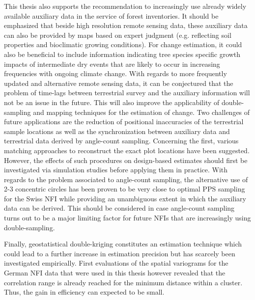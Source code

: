 This thesis also supports the recommendation to increasingly use already widely available auxiliary data in the service of forest inventories. It should be emphasized that beside high resolution remote sensing data, these auxiliary data can also be provided by maps based on expert judgment (e.g. reflecting soil properties and bioclimatic growing conditions). For change estimation, it could also be beneficial to include information indicating tree species specific growth impacts of intermediate dry events that are likely to occur in increasing frequencies with ongoing climate change. With regards to more frequently updated and alternative remote sensing data, it can be conjectured that the problem of time-lags between terrestrial survey and the auxiliary information will not be an issue in the future. This will also improve the applicability of double-sampling and mapping techniques for the estimation of change. Two challenges of future applications are the reduction of positional inaccuracies of the terrestrial sample locations as well as the synchronization between auxiliary data and terrestrial data derived by angle-count sampling. Concerning the first, various matching approaches to reconstruct the exact plot locations have been suggested. However, the effects of such procedures on design-based estimates should first be investigated via simulation studies before applying them in practice. With regards to the problem associated to angle-count sampling, the alternative use of 2-3 concentric circles has been proven to be very close to optimal PPS sampling for the Swiss NFI \citep{mandallaz2008} while providing an unambiguous extent in which the auxiliary data can be derived. This should be considered in case angle-count sampling turns out to be a major limiting factor for future NFIs that are increasingly using double-sampling.\par
 
Finally, geostatistical double-kriging constitutes an estimation technique which could lead to a further increase in estimation precision but has scarcely been investigated empirically. First evaluations of the spatial variograms for the German NFI data that were used in this thesis however revealed that the correlation range is already reached for the minimum distance within a cluster. Thus, the gain in efficiency can expected to be small.




